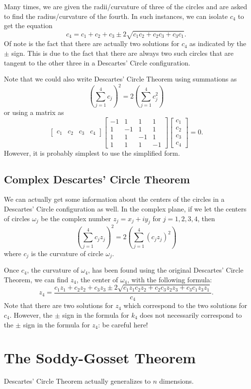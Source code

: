 \documentclass{article}
\begin{document}
Many times, we are given the radii/curvature of three of the circles and are asked to find the radius/curvature of the fourth. In such instances, we can isolate $c_4$ to get the equation $$c_4=c_1+c_2+c_3\pm 2\sqrt{c_1c_2+c_2c_3+c_3c_1}.$$ Of note is the fact that there are actually two solutions for $c_4$ as indicated by the $\pm$ sign. This is due to the fact that there are always two such circles that are tangent to the other three in a Descartes' Circle configuration. 

Note that we could also write Descartes' Circle Theorem using summations as $$\left(\sum_{j=1}^4 c_j\right)^2=2\left(\sum_{j=1}^4 c_j^2\right)$$ or using a matrix as $$\begin{bmatrix} c_1&c_2&c_3&c_4\end{bmatrix} \begin{bmatrix}-1&1&1&1\\1&-1&1&1\\1&1&-1&1\\1&1&1&-1 \end{bmatrix}  \begin{bmatrix} c_1\\c_2\\c_3\\c_4\end{bmatrix}=0.$$ However, it is probably simplest to use the simplified form.
\subsection{Complex Descartes' Circle Theorem}
We can actually get some information about the centers of the circles in a Descartes' Circle configuration as well. In the complex plane, if we let the centers of circles $\omega_j$ be the complex number $z_j=x_j+iy_j$ for $j=1,2,3,4$, then $$\left(\sum_{j=1}^4 c_jz_j\right)^2=2\left(\sum_{j=1}^4 (c_jz_j)^2\right)$$ where $c_j$ is the curvature of circle $\omega_j$. 

Once $c_4$, the curvature of $\omega_4$, has been found using the original Descartes' Circle Theorem, we can find $z_4$, the center of $\omega_4$, with the following formula: $$z_4=\frac{c_1z_1+c_2z_2+c_3z_3\pm 2\sqrt{c_1z_1c_2z_2+c_2c_3z_2z_3+c_3c_1z_3z_1}}{c_4}.$$ Note that there are two solutions for $z_4$ which correspond to the two solutions for $c_4$. However, the $\pm$ sign in the formula for $k_4$ does not necessarily correspond to the $\pm$ sign in the formula for $z_4$: be careful here!
\section{The Soddy-Gosset Theorem}
Descartes' Circle Theorem actually generalizes to $n$ dimensions. 
\end{document}

